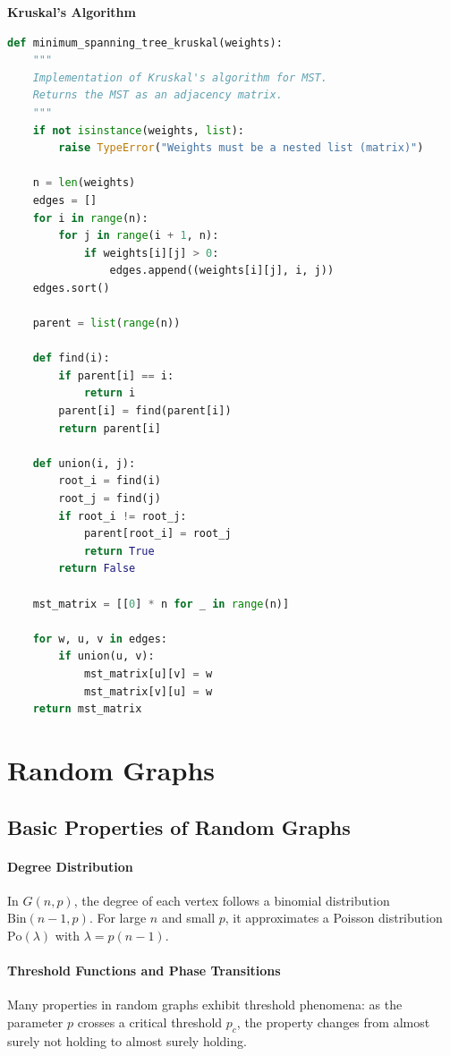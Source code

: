 \textbf{Kruskal's Algorithm}
\begin{lstlisting}[language=Python]
def minimum_spanning_tree_kruskal(weights):
    """
    Implementation of Kruskal's algorithm for MST.
    Returns the MST as an adjacency matrix.
    """
    if not isinstance(weights, list):
        raise TypeError("Weights must be a nested list (matrix)")

    n = len(weights)
    edges = []
    for i in range(n):
        for j in range(i + 1, n):
            if weights[i][j] > 0:
                edges.append((weights[i][j], i, j))
    edges.sort()
    
    parent = list(range(n))
    
    def find(i):
        if parent[i] == i:
            return i
        parent[i] = find(parent[i])
        return parent[i]
        
    def union(i, j):
        root_i = find(i)
        root_j = find(j)
        if root_i != root_j:
            parent[root_i] = root_j
            return True
        return False
        
    mst_matrix = [[0] * n for _ in range(n)]
    
    for w, u, v in edges:
        if union(u, v):
            mst_matrix[u][v] = w
            mst_matrix[v][u] = w
    return mst_matrix
\end{lstlisting}



\section{Random Graphs}

\subsection{Basic Properties of Random Graphs}

\paragraph{Degree Distribution}
\begin{theorem}
In $G(n,p)$, the degree of each vertex follows a binomial distribution $\text{Bin}(n-1, p)$. For large $n$ and small $p$, it approximates a Poisson distribution $\text{Po}(\lambda)$ with $\lambda = p(n-1)$.
\end{theorem}

\paragraph{Threshold Functions and Phase Transitions}
Many properties in random graphs exhibit threshold phenomena: as the parameter $p$ crosses a critical threshold $p_c$, the property changes from almost surely not holding to almost surely holding.

